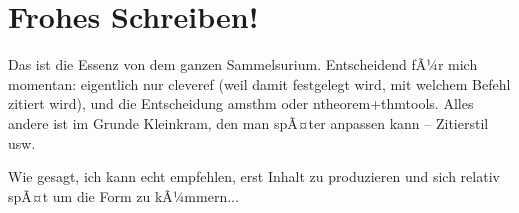 \documentclass[draft,twoside=semi,openright,cleardoublepage=empty,titlepage,numbers=noenddot,headinclude=false,footinclude=false,english,10pt]{scrreprt}
\begin{document}
\chapter{Frohes Schreiben!}

Das ist die Essenz von dem ganzen Sammelsurium.
Entscheidend fÃ¼r mich momentan: eigentlich nur cleveref (weil damit festgelegt wird, mit welchem Befehl zitiert wird),
und die Entscheidung amsthm oder ntheorem+thmtools.
Alles andere ist im Grunde Kleinkram, den man spÃ¤ter anpassen kann -- Zitierstil usw.

Wie gesagt, ich kann echt empfehlen, erst Inhalt zu produzieren und sich relativ spÃ¤t um die Form zu kÃ¼mmern...

\blinddocument
\end{document}
